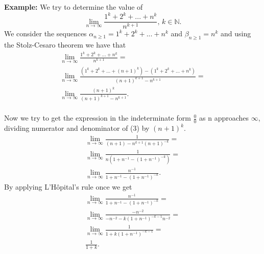 \documentclass[12pt]{article}
\begin{document}
\textbf{Example:}
We try to determine the value of
$$\lim_{n\to \infty}\frac{1^k+2^k+...+n^k}{n^{k+1}},\,k\in \mathbb{N}.$$
We consider the sequences $\alpha_{n\geq 1}=1^k+2^k+...+n^k$ and $\beta_{n\geq 1}=n^k$
and using the Stolz-Cesaro theorem we have that
\begin{eqnarray}
\lim_{n\to \infty}\frac{1^k+2^k+...+n^k}{n^{k+1}}=\\
\lim_{n\to \infty}\frac{(1^k+2^k+...+(n+1)^k)-(1^k+2^k+...+n^k)}{(n+1)^{k+1}-n^{k+1}}=\\
\lim_{n\to \infty}\frac{(n+1)^k}{{(n+1)^{k+1}-n^{k+1}}}.
\end{eqnarray}
\\Now we try to get the expression in the indeterminate 
form $\frac{0}{0}$ as n approaches $\infty$, dividing numerator and denominator of 
(3) by $(n+1)^k$.  
\begin{eqnarray}
\lim_{n\to \infty}\frac{1}{(n+1)-n^{k+1}(n+1)^{-k}}=\\
\lim_{n\to \infty}\frac{1}{n(1+n^{-1}-(1+n^{-1})^{-k})}=\\
\lim_{n\to \infty}\frac{n^{-1}}{1+n^{-1}-(1+n^{-1})^{-k}}.
\end{eqnarray}
By applying L'H\^opital's rule once we get
\begin{eqnarray}
\lim_{n\to \infty}\frac{n^{-1}}{1+n^{-1}-(1+n^{-1})^{-k}}=\\
\lim_{n\to \infty}\frac{-n^{-2}}{-n^{-2}-k(1
+n^{-1})^{-k-1}n^{-2}}=\\
\lim_{n\to \infty}\frac{1}{1+k(1+n^{-1})^{-k-1}}=\\
\frac{1}{1+k}.
\end{eqnarray}
\end{document}
